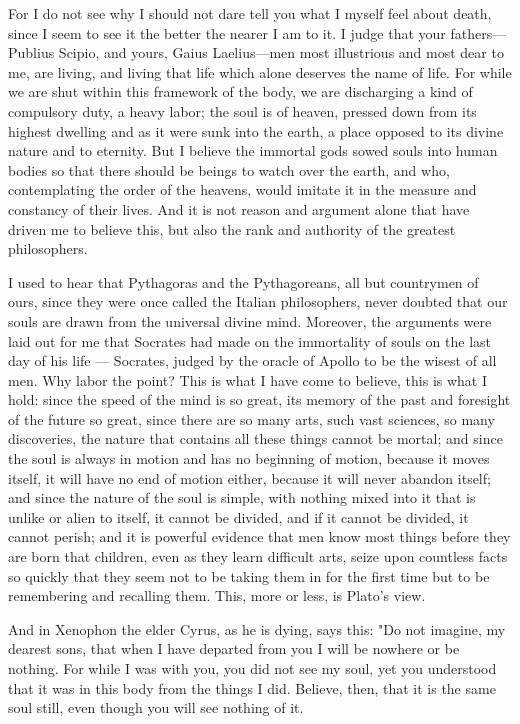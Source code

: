  For I do not see why I should not dare tell you what I myself feel about death, since I seem to see it the better the nearer I am to it. I judge that your fathers—Publius Scipio, and yours, Gaius Laelius—men most illustrious and most dear to me, are living, and living that life which alone deserves the name of life. For while we are shut within this framework of the body, we are discharging a kind of compulsory duty, a heavy labor; the soul is of heaven, pressed down from its highest dwelling and as it were sunk into the earth, a place opposed to its divine nature and to eternity. But I believe the immortal gods sowed souls into human bodies so that there should be beings to watch over the earth, and who, contemplating the order of the heavens, would imitate it in the measure and constancy of their lives. And it is not reason and argument alone that have driven me to believe this, but also the rank and authority of the greatest philosophers.

 I used to hear that Pythagoras and the Pythagoreans, all but countrymen of ours, since they were once called the Italian philosophers, never doubted that our souls are drawn from the universal divine mind. Moreover, the arguments were laid out for me that Socrates had made on the immortality of souls on the last day of his life — Socrates, judged by the oracle of Apollo to be the wisest of all men. Why labor the point? This is what I have come to believe, this is what I hold: since the speed of the mind is so great, its memory of the past and foresight of the future so great, since there are so many arts, such vast sciences, so many discoveries, the nature that contains all these things cannot be mortal; and since the soul is always in motion and has no beginning of motion, because it moves itself, it will have no end of motion either, because it will never abandon itself; and since the nature of the soul is simple, with nothing mixed into it that is unlike or alien to itself, it cannot be divided, and if it cannot be divided, it cannot perish; and it is powerful evidence that men know most things before they are born that children, even as they learn difficult arts, seize upon countless facts so quickly that they seem not to be taking them in for the first time but to be remembering and recalling them. This, more or less, is Plato's view.

 And in Xenophon the elder Cyrus, as he is dying, says this: "Do not imagine, my dearest sons, that when I have departed from you I will be nowhere or be nothing. For while I was with you, you did not see my soul, yet you understood that it was in this body from the things I did. Believe, then, that it is the same soul still, even though you will see nothing of it.


